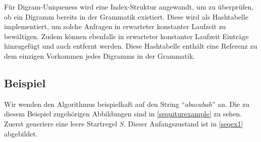 Für Digram-Uniqueness wird eine Index-Struktur angewandt, um zu überprüfen, ob ein Digramm bereits in der Grammatik existiert. Diese wird als Hashtabelle implementiert, um solche Anfragen in erwarteter konstanter Laufzeit zu bewältigen. Zudem können ebenfalls in erwarteter konstanter Laufzeit Einträge hinzugefügt und auch entfernt werden. Diese Hashtabelle enthält eine Referenz zu dem einzigen Vorkommen jedes Digramms in der Grammatik. 


\subsection{Beispiel}

Wir wenden den Algorithmus beispielhaft auf den String \enquote{$abacabab$} an. Die zu diesem Beispiel zugehörigen Abbildungen sind in \autoref{sequiturexample} zu sehen.\\
Zuerst generiere eine leere Startregel $S$. Dieser Anfangszustand ist in \autoref{seqex1} abgebildet.

